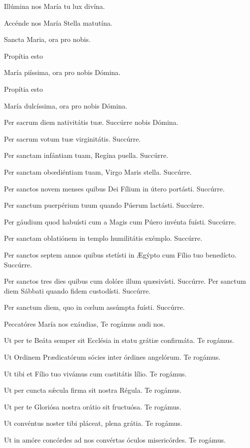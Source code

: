 \documentclass[12pt,a6paper]{book}
\begin{document}
\begin{sloppy}
Illúmina nos María tu lux divína.

Accénde nos María Stella matutína.

\vspace{3mm}

Sancta Maria, ora pro nobis.

Propítia esto

María piíssima, ora pro nobis Dómina.

Propítia esto

María dulcíssima, ora pro nobis Dómina.

Per sacrum diem nativitátis tuæ. Succúrre nobis Dómina.

Per sacrum votum tuæ virginitátis. Succúrre.

Per sanctam infántiam tuam, Regína puella. Succúrre.

Per sanctam obœdiéntiam tuam, Virgo Maris stella. Succúrre.

Per sanctos novem menses quibus Dei Fílium in útero 
portásti. Succúrre.

Per sanctum puerpérium tuum quando Púerum lactásti. Succúrre.

Per gáudium quod habuísti cum a Magis cum Púero invénta fuísti. Succúrre.

Per sanctam oblatiónem in templo humilitátis exémplo. Succúrre.

Per sanctos septem annos quibus stetísti in Ægýpto cum 
Fílio tuo benedícto. Succúrre.

Per sanctos tres dies quibus cum dolóre illum quæsivísti. Succúrre.
Per sanctum diem Sábbati quando fidem custodísti. Succúrre.

Per sanctum diem, quo in cœlum assúmpta fuísti. Succúrre.

Peccatóres María nos exáudias, Te rogámus audi nos.

Ut per te Beáta semper sit Ecclésia in statu grátiæ confirmáta. Te rogámus.

Ut Ordinem Prædicatórum sócies inter órdines angelórum. Te rogámus.

Ut tibi et Fílio tuo vivámus cum castitátis lílio. Te rogámus.

Ut per cuncta sǽcula firma sit nostra Régula. Te rogámus.

Ut per te Gloriósa nostra orátio sit fructuósa. Te rogámus.

Ut convéntus noster tibi pláceat, plena grátia. Te rogámus.

Ut in amóre concórdes ad nos convértas óculos misericórdes. Te rogámus.


\end{sloppy}
\end{document}

